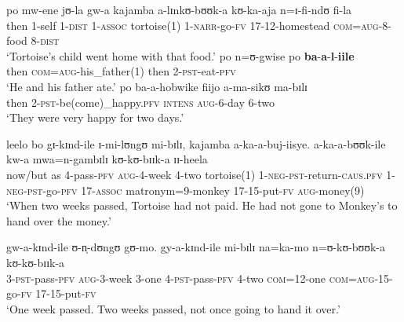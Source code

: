\begin{exe}
\ex \label{exMonkeyTortoiseFirstNoPaying} \begin{xlist}
\ex \label{exMonkeyTortoiseSentence1} \gll po mw-ene jʊ-la gw-a kajamba a-lɪnkʊ-bʊʊk-a kʊ-ka-aja n=ɪ-fi-ndʊ fi-la\\
then 1-self 1-\textsc{dist} 1-\textsc{assoc} tortoise(1) 1-\textsc{narr}-go-\textsc{fv} 17-12-homestead \textsc{com}=\textsc{aug}-8-food 8-\textsc{dist}\\
\glt \lq Tortoise's child went home with that food.'
\ex \label{exMonkeyTortoiseSentence2}
\gll po n=ʊ-gwise po \textbf{ba}-\textbf{a}-\textbf{l}-\textbf{iile}\\
then \textsc{com}=\textsc{aug}-his\_father(1) then 2-\textsc{pst}-eat-\textsc{pfv}\\
\glt \lq  He and his father ate.'
\ex \label{exMonkeyTortoiseSentence3}
\gll po ba-a-hobwike fiijo a-ma-sikʊ ma-bɪlɪ\\
then 2-\textsc{pst}-be(come)\_happy.\textsc{pfv} \textsc{intens} \textsc{aug}-6-day 6-two\\
\glt \lq They were very happy for two days.'

\ex \label{exMonkeyTortoiseSentences4and5} \gll leelo bo gɪ-kɪnd-ile ɪ-mi-lʊngʊ mi-bɪlɪ, kajamba a-ka-a-buj-iisye. a-ka-a-bʊʊk-ile kw-a mwa=n-gambɪlɪ kʊ-kʊ-bɪɪk-a ɪɪ-heela\\
now/but as 4-pass-\textsc{pfv} \textsc{aug}-4-week 4-two tortoise(1) 1-\textsc{neg}-\textsc{pst}-return-\textsc{caus.pfv} 1-\textsc{neg}-\textsc{pst}-go-\textsc{pfv} 17-\textsc{assoc} matronym=9-monkey 17-15-put-\textsc{fv} \textsc{aug}-money(9)\\
\glt \lq When two weeks passed, Tortoise had not paid. ‎‎He had not gone to Monkey's to hand over the money.'

\ex  \label{exMonkeyTortoiseSentences6and7} \gll gw-a-kɪnd-ile ʊ-n̩-dʊngʊ gʊ-mo. gy-a-kɪnd-ile mi-bɪlɪ na=ka-mo n=ʊ-kʊ-bʊʊk-a kʊ-kʊ-bɪɪk-a\\
3-\textsc{pst}-pass-\textsc{pfv} \textsc{aug}-3-week 3-one 4-\textsc{pst}-pass-\textsc{pfv} 4-two \textsc{com}=12-one \textsc{com}=\textsc{aug}-15-go-\textsc{fv} 17-15-put-\textsc{fv}\\
\glt\lq One week passed. Two weeks passed, not once going to hand it over.'


\end{xlist}
\end{exe}
